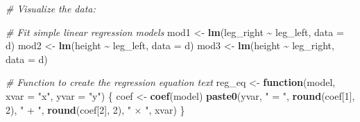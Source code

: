 \documentclass[
]{book}
\newenvironment{Shaded}{\begin{snugshade}}{\end{snugshade}}
\newcommand{\AttributeTok}[1]{\textcolor[rgb]{0.13,0.29,0.53}{#1}}
\newcommand{\CommentTok}[1]{\textcolor[rgb]{0.56,0.35,0.01}{\textit{#1}}}
\newcommand{\ControlFlowTok}[1]{\textcolor[rgb]{0.13,0.29,0.53}{\textbf{#1}}}
\newcommand{\DecValTok}[1]{\textcolor[rgb]{0.00,0.00,0.81}{#1}}
\newcommand{\FunctionTok}[1]{\textcolor[rgb]{0.13,0.29,0.53}{\textbf{#1}}}
\newcommand{\NormalTok}[1]{#1}
\newcommand{\OtherTok}[1]{\textcolor[rgb]{0.56,0.35,0.01}{#1}}
\newcommand{\SpecialCharTok}[1]{\textcolor[rgb]{0.81,0.36,0.00}{\textbf{#1}}}
\newcommand{\StringTok}[1]{\textcolor[rgb]{0.31,0.60,0.02}{#1}}
\begin{document}
\begin{Shaded}
\begin{Highlighting}[]
\CommentTok{\# Visualize the data:}

\CommentTok{\# Fit simple linear regression models}
\NormalTok{mod1 }\OtherTok{\textless{}{-}} \FunctionTok{lm}\NormalTok{(leg\_right }\SpecialCharTok{\textasciitilde{}}\NormalTok{ leg\_left, }\AttributeTok{data =}\NormalTok{ d)}
\NormalTok{mod2 }\OtherTok{\textless{}{-}} \FunctionTok{lm}\NormalTok{(height }\SpecialCharTok{\textasciitilde{}}\NormalTok{ leg\_left, }\AttributeTok{data =}\NormalTok{ d)}
\NormalTok{mod3 }\OtherTok{\textless{}{-}} \FunctionTok{lm}\NormalTok{(height }\SpecialCharTok{\textasciitilde{}}\NormalTok{ leg\_right, }\AttributeTok{data =}\NormalTok{ d)}

\CommentTok{\# Function to create the regression equation text}
\NormalTok{reg\_eq }\OtherTok{\textless{}{-}} \ControlFlowTok{function}\NormalTok{(model, }\AttributeTok{xvar =} \StringTok{"x"}\NormalTok{, }\AttributeTok{yvar =} \StringTok{"y"}\NormalTok{) \{}
\NormalTok{  coef }\OtherTok{\textless{}{-}} \FunctionTok{coef}\NormalTok{(model)}
  \FunctionTok{paste0}\NormalTok{(yvar, }\StringTok{" = "}\NormalTok{,}
         \FunctionTok{round}\NormalTok{(coef[}\DecValTok{1}\NormalTok{], }\DecValTok{2}\NormalTok{), }\StringTok{" + "}\NormalTok{,}
         \FunctionTok{round}\NormalTok{(coef[}\DecValTok{2}\NormalTok{], }\DecValTok{2}\NormalTok{), }\StringTok{" × "}\NormalTok{, xvar)}
\NormalTok{\}}


\end{Highlighting}
\end{Shaded}
\end{document}
